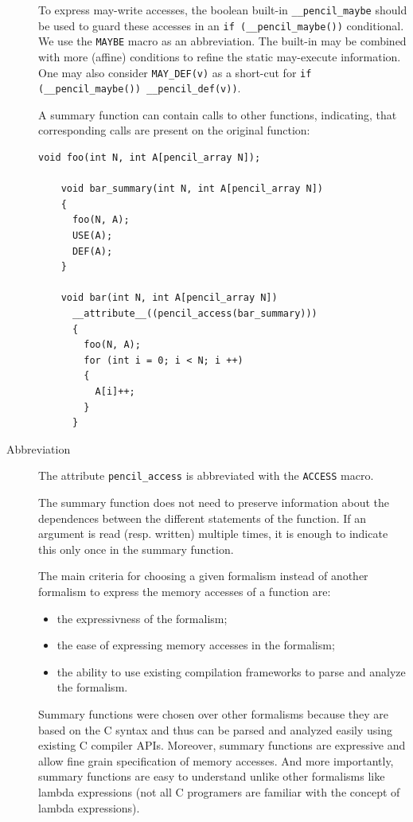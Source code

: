 \documentclass{carp}
\begin{document}
\begin{description}
  To express may-write accesses, the boolean built-in
  \lstinline!__pencil_maybe! should be used to guard these accesses
  in an \lstinline!if (__pencil_maybe())!  conditional. We use the
  \lstinline!MAYBE! macro as an abbreviation. The
  built-in may be combined with more (affine) conditions to refine
  the static may-execute information. One may also consider
  \lstinline!MAY_DEF(v)! as a short-cut for
  \lstinline!if (__pencil_maybe()) __pencil_def(v))!.

  A summary function can contain calls to other functions, indicating,
  that corresponding calls are present on the original function:

  \begin{lstlisting}[language=pencil]
    void foo(int N, int A[pencil_array N]);

    void bar_summary(int N, int A[pencil_array N])
    {
      foo(N, A);
      USE(A);
      DEF(A);
    }

    void bar(int N, int A[pencil_array N])
      __attribute__((pencil_access(bar_summary)))
      {
        foo(N, A);
        for (int i = 0; i < N; i ++)
        {
          A[i]++;
        }
      }
  \end{lstlisting}

  \item[Abbreviation] The attribute \lstinline!pencil_access! is
  abbreviated with the \lstinline!ACCESS! macro.
  
  The summary function does not need to preserve information about
  the dependences between the different statements of the function.
  If an argument is read (resp. written) multiple times, it is enough
  to indicate this only once in the summary function.

  The main criteria for choosing a given formalism instead of another
  formalism to express the memory accesses of a function are:
  \begin{itemize}
   \item the expressivness of the formalism;
   \item the ease of expressing memory accesses in the formalism;
   \item the ability to use existing compilation frameworks to parse
         and analyze the formalism.
  \end{itemize}

  Summary functions were chosen over other formalisms because they are based
  on the C syntax and thus can be parsed and analyzed easily using existing C
  compiler APIs.
  Moreover, summary functions are expressive and allow fine grain
  specification of memory accesses.
  And more importantly, summary functions are easy to understand unlike other
  formalisms like lambda expressions (not all C programers are familiar with
  the concept of lambda expressions).
  

\end{description}
\end{document}
